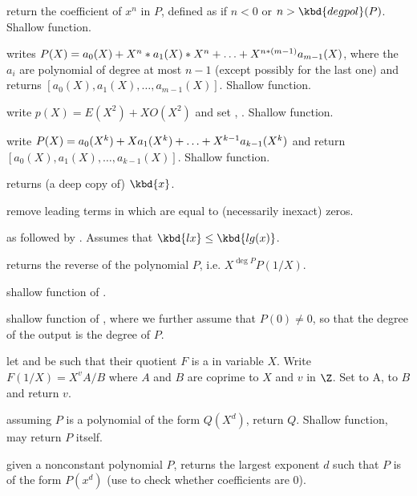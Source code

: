 
 return the coefficient of $x^n$ in $P$,
defined as  if $n < 0$ or $n > \kbd{degpol}(P)$. Shallow
function.

 writes
$P(X)=a_0(X)+X^n*a_1(X)*X^n+\ldots+X^{n*(m-1)}\*a_{m-1}(X)$,
where the $a_i$ are polynomial of degree at most $n-1$
(except possibly for the last one) and returns
$[a_0(X),a_1(X),\ldots,a_{m-1}(X)]$.  Shallow function.

 write $p(X) = E(X^2) +
X O(X^2)$ and set , .  Shallow function.

 write
$P(X)=a_0(X^k)+X\*a_1(X^k)+\ldots+X^{k-1}\*a_{k-1}(X^k)$ and return
$[a_0(X),a_1(X),\ldots,a_{k-1}(X)]$.  Shallow function.

 returns (a deep copy of) $\kbd{x}$.

 remove leading terms in  which are
equal to (necessarily inexact) zeros.

 as 
followed by . Assumes that $\kbd{lx} \leq
\kbd{lg(x)}$.

 returns the reverse of the polynomial
$P$, i.e. $X^{\deg P} P(1/X)$.

 shallow function of .

 shallow function of ,
where we further assume that $P(0)\neq 0$, so that the degree of the output
is the degree of $P$.

 let  and  be such that
their quotient $F$ is a  in variable $X$. Write $F(1/X) = X^v A/B$
where $A$ and $B$ are coprime to $X$ and $v$ in $\Z$. Set  to A,
 to $B$ and return $v$.

 assuming $P$ is a polynomial of the
form $Q(X^d)$, return $Q$. Shallow function, may return $P$ itself.

 given a nonconstant polynomial
$P$, returns the largest exponent $d$ such that $P$ is of the form $P(x^d)$
(use  to check whether coefficients are 0).

